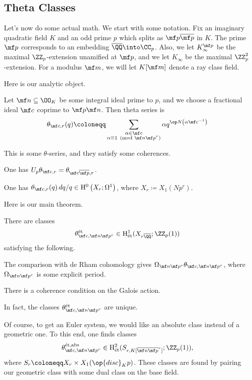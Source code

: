 \documentclass{article}
\begin{document}
\subsection{Theta Classes}
Let's now do some actual math. We start with some notation. Fix an imaginary quadratic field $K$ and an odd prime $p$ which splits as $\mf p\overline{\mf p}$ in $K$. The prime $\mf p$ corresponds to an embedding $\overline\QQ\into\CC_p$. Also, we let $K_\infty^{\mf p}$ be the maximal $\ZZ_p$-extension unamified at $\mf p$, and we let $K_\infty$ be the maximal $\ZZ_p^2$-extension. For a modulus $\mf m$, we will let $K[\mf m]$ denote a ray class field.

Here is our analytic object.
\begin{definition}
	Let $\mf n\subseteq\OO_K$ be some integral ideal prime to $p$, and we choose a fractional ideal $\mf c$ coprime to $\mf p\mf n$. Then theta series is
	\[\theta_{\mf c,r}(q)\coloneqq\sum_{\substack{\alpha\in\mf c\\\alpha\equiv1\pmod{\mf n\mf p^r}}}\alpha q^{\op N\left(\alpha\mf c^{-1}\right)}\]
\end{definition}
This is some $\theta$-series, and they satisfy some coherences.
\begin{example}
	One has $U_p\theta_{\mf c,r}=\theta_{\mf c\overline{\mf p},r}$.
\end{example}
\begin{example}
	One has $\theta_{\mf c,r}(q)\,dq/q\in\mathrm H^0\left(X_r;\Omega^1\right)$, where $X_r\coloneqq X_1(Np^r)$.
\end{example}
Here is our main theorem.
\begin{theorem}
	There are classes
	\[\theta_{\mf c,\mf n\mf p^r}^{\mathrm{\acute et}}\in\mathrm H^1_{\mathrm{\acute et}}(X_{r\overline\QQ};\ZZ_p(1))\]
	satisfying the following.
	\begin{listroman}
		\item The comparison with de Rham cohomology gives $\Omega_{\mf n\mf p^r}\theta_{\mf c,\mf n\mf p^r}$, where $\Omega_{\mf n\mf p^r}$ is some explicit period.
		\item There is a coherence condition on the Galois action.
	\end{listroman}
	In fact, the classes $\theta_{\mf c,\mf n\mf p^r}^{\mathrm{\acute et}}$ are unique.
\end{theorem}
\begin{remark}
	Of course, to get an Euler system, we would like an absolute class instead of a geometric one. To this end, one finds classes
	\[\theta_{\mf c,\mf n\mf p^r}^{\mathrm{\acute et},\mathrm{abs}}\in\mathrm H^2_{\mathrm{\acute et}}(S_{r,K[\overline{\mf n}\overline{\mf p}^r]};\ZZ_p(1)),\]
	where $S_r\coloneqq X_r\times X_1(\op{disc}_Kp)$. These classes are found by pairing our geometric class with some dual class on the base field.
\end{remark}
\end{document}
